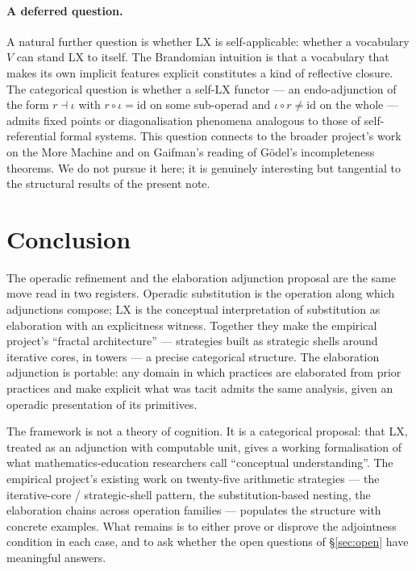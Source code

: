 \documentclass[11pt]{article}
\begin{document}
\paragraph{A deferred question.} A natural further question is
whether LX is self-applicable: whether a vocabulary $V$ can stand
LX to itself. The Brandomian intuition is that a vocabulary that
makes its own implicit features explicit constitutes a kind of
reflective closure. The categorical question is whether a self-LX
functor — an endo-adjunction of the form $r \dashv \iota$ with
$r \circ \iota = \mathrm{id}$ on some sub-operad and $\iota \circ r
\ne \mathrm{id}$ on the whole — admits fixed points or
diagonalisation phenomena analogous to those of self-referential
formal systems. This question connects to the broader project's
work on the More Machine and on Gaifman's reading of G\"odel's
incompleteness theorems. We do not pursue it here; it is genuinely
interesting but tangential to the structural results of the
present note.

\section{Conclusion}

The operadic refinement and the elaboration adjunction proposal are the same
move read in two registers. Operadic substitution is the operation
along which adjunctions compose; LX is the conceptual interpretation
of substitution as elaboration with an explicitness witness. Together
they make the empirical project's ``fractal architecture'' — strategies
built as strategic shells around iterative cores, in towers — a
precise categorical structure. The elaboration adjunction is portable: any
domain in which practices are elaborated from prior practices and
make explicit what was tacit admits the same analysis, given an
operadic presentation of its primitives.

The framework is not a theory of cognition. It is a categorical
proposal: that LX, treated as an adjunction with computable unit,
gives a working formalisation of what mathematics-education researchers
call ``conceptual understanding''. The empirical project's existing
work on twenty-five arithmetic strategies — the iterative-core /
strategic-shell pattern, the substitution-based nesting, the
elaboration chains across operation families — populates the structure
with concrete examples. What remains is to either prove or disprove
the adjointness condition in each case, and to ask whether the open
questions of \S\ref{sec:open} have meaningful answers.

\printbibliography
\end{document}
